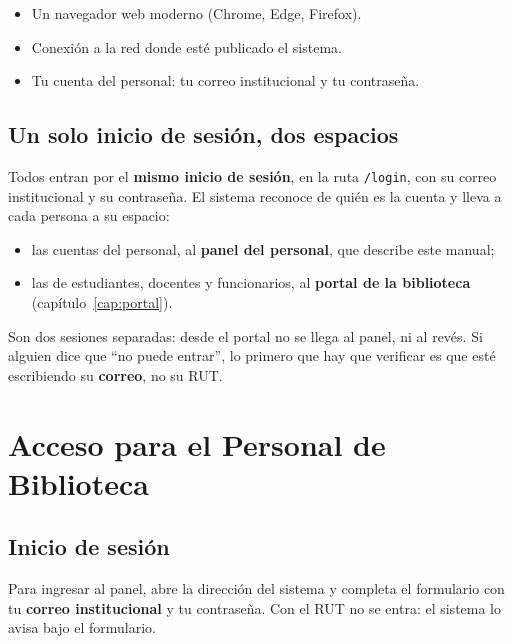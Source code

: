 \documentclass[11pt,a4paper]{report}
\begin{document}
\begin{itemize}
  \item Un navegador web moderno (Chrome, Edge, Firefox).
  \item Conexión a la red donde esté publicado el sistema.
  \item Tu cuenta del personal: tu correo institucional y tu contraseña.
\end{itemize}

\section{Un solo inicio de sesión, dos espacios}

Todos entran por el \textbf{mismo inicio de sesión}, en la ruta
\texttt{/login}, con su correo institucional y su contraseña. El sistema
reconoce de quién es la cuenta y lleva a cada persona a su espacio:

\begin{itemize}
  \item las cuentas del personal, al \textbf{panel del personal}, que
  describe este manual;
  \item las de estudiantes, docentes y funcionarios, al \textbf{portal de
  la biblioteca} (capítulo~\ref{cap:portal}).
\end{itemize}

Son dos sesiones separadas: desde el portal no se llega al panel, ni al
revés. Si alguien dice que ``no puede entrar'', lo primero que hay que
verificar es que esté escribiendo su \textbf{correo}, no su RUT.

\chapter{Acceso para el Personal de Biblioteca}

\section{Inicio de sesión}

Para ingresar al panel, abre la dirección del sistema y completa el
formulario con tu \textbf{correo institucional} y tu contraseña. Con el
RUT no se entra: el sistema lo avisa bajo el formulario.

\end{document}
